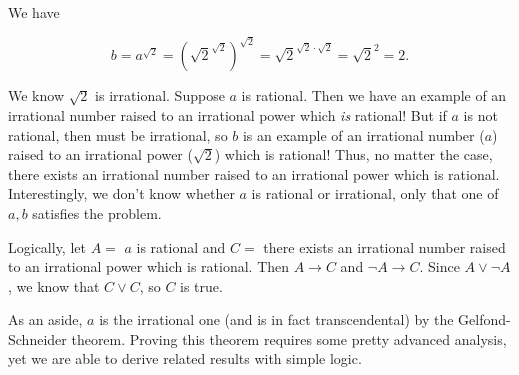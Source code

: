 \documentclass[../key.tex]{subfiles}
\begin{document}
\noindent We have

$$b = a^{\sqrt{2}} = \left(\sqrt{2}^{\sqrt{2}}\right)^{\sqrt{2}} = \sqrt{2} ^ {\sqrt{2}\cdot \sqrt{2}} = \sqrt{2}^2 = 2.$$

\noindent We know $\sqrt{2}$ is irrational. Suppose $a$ is rational. Then we have an example of an irrational number raised to an irrational power which \textit{is} rational! But if $a$ is not rational, then must be irrational, so $b$ is an example of an irrational number ($a$) raised to an irrational power ($\sqrt{2}$) which is rational! Thus, no matter the case, there exists an irrational number raised to an irrational power which is rational. Interestingly, we don't know whether $a$ is rational or irrational, only that one of $a,b$ satisfies the problem.

Logically, let $A=$ $a$ is rational and $C=$ there exists an irrational number raised to an irrational power which is rational. Then $A\to C$ and $\lnot A\to C$. Since $A \lor \lnot A$, we know that $C\lor C$, so $C$ is true.

As an aside, $a$ is the irrational one (and is in fact transcendental) by the Gelfond-Schneider theorem. Proving this theorem requires some pretty advanced analysis, yet we are able to derive related results with simple logic.
\end{document}
